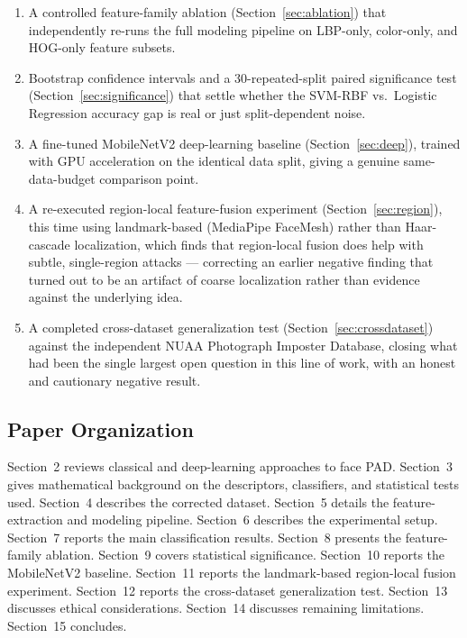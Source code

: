 \documentclass[11pt]{article}
\begin{document}
\begin{enumerate}[label=(\roman*)]
\item A controlled feature-family ablation (Section~\ref{sec:ablation}) that independently re-runs the full modeling pipeline on LBP-only, color-only, and HOG-only feature subsets.
\item Bootstrap confidence intervals and a 30-repeated-split paired significance test (Section~\ref{sec:significance}) that settle whether the SVM-RBF vs.\ Logistic Regression accuracy gap is real or just split-dependent noise.
\item A fine-tuned MobileNetV2 deep-learning baseline (Section~\ref{sec:deep}), trained with GPU acceleration on the identical data split, giving a genuine same-data-budget comparison point.
\item A re-executed region-local feature-fusion experiment (Section~\ref{sec:region}), this time using landmark-based (MediaPipe FaceMesh) rather than Haar-cascade localization, which finds that region-local fusion does help with subtle, single-region attacks --- correcting an earlier negative finding that turned out to be an artifact of coarse localization rather than evidence against the underlying idea.
\item A completed cross-dataset generalization test (Section~\ref{sec:crossdataset}) against the independent NUAA Photograph Imposter Database, closing what had been the single largest open question in this line of work, with an honest and cautionary negative result.
\end{enumerate}

\subsection{Paper Organization}

Section~2 reviews classical and deep-learning approaches to face PAD. Section~3 gives mathematical background on the descriptors, classifiers, and statistical tests used. Section~4 describes the corrected dataset. Section~5 details the feature-extraction and modeling pipeline. Section~6 describes the experimental setup. Section~7 reports the main classification results. Section~8 presents the feature-family ablation. Section~9 covers statistical significance. Section~10 reports the MobileNetV2 baseline. Section~11 reports the landmark-based region-local fusion experiment. Section~12 reports the cross-dataset generalization test. Section~13 discusses ethical considerations. Section~14 discusses remaining limitations. Section~15 concludes.
\end{document}
